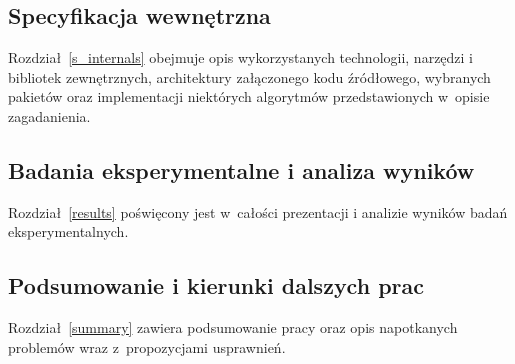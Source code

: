 \subsection{Specyfikacja wewnętrzna}
\par{
  Rozdział~\ref{s_internals} obejmuje opis wykorzystanych technologii, narzędzi i bibliotek zewnętrznych, architektury załączonego kodu źródłowego, wybranych pakietów oraz implementacji niektórych algorytmów przedstawionych w~opisie zagadanienia.
}
\subsection{Badania eksperymentalne i analiza wyników}
\par{
  Rozdział~\ref{results} poświęcony jest w~całości prezentacji i analizie wyników badań eksperymentalnych.
}
\subsection{Podsumowanie i kierunki dalszych prac}
\par{
  Rozdział~\ref{summary} zawiera podsumowanie pracy oraz opis napotkanych problemów wraz z~propozycjami usprawnień.
}
